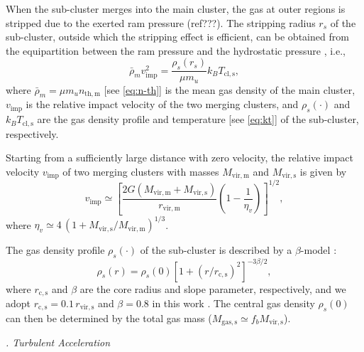 \documentclass[modern]{aastex62}
\newcommand{\R}[1]{\mathrm{#1}}
\newcommand{\editwip}[1]{{\leavevmode\color{magenta}#1}}
\newcounter{sssseccount}
\newcommand{\sssseclabel}{\alph{sssseccount}}
\newcommand{\ssssec}[1]{%
  \vspace{1ex}%
  \stepcounter{sssseccount}%
  \noindent\emph{\sssseclabel. #1}%
}
\begin{document}
\editwip{%
When the sub-cluster merges into the main cluster, the gas at outer regions
is stripped due to the exerted ram pressure (ref???).
The stripping radius $r_s$ of the sub-cluster, outside which the stripping
effect is efficient, can be obtained from the equipartition between the ram
pressure and the hydrostatic pressure \citep{cassano2005}, i.e.,
\begin{equation}
  \label{eq:rs-eqp}
  \bar{\rho}_m v_{\R{imp}}^2 = \frac{\rho_s(r_s)}{\mu m_u} k_B T_{\R{cl,s}},
\end{equation}
where
$\bar{\rho}_m = \mu m_u n_{\R{th,m}}$ [see \autoref{eq:n-th}] is the mean
gas density of the main cluster,
$v_{\R{imp}}$ is the relative impact velocity of the two merging clusters,
and $\rho_s(\cdot)$ and $k_B T_{\R{cl,s}}$ are the gas density profile and
temperature [see \autoref{eq:kt}] of the sub-cluster, respectively.

Starting from a sufficiently large distance with zero velocity,
the relative impact velocity $v_{\R{imp}}$ of two merging clusters with
masses $M_{\R{vir,m}}$ and $M_{\R{vir,s}}$ is given by
\citep{sarazin2002,cassano2005}
\begin{equation}
  \label{eq:v-imp}
  v_{\R{imp}} \simeq \left[
    \frac{2G (M_{\R{vir,m}} + M_{\R{vir,s}})}{r_{\R{vir,m}}}
    \left( 1 - \frac{1}{\eta_v} \right)\right]^{1/2},
\end{equation}
where $\eta_v \simeq 4 \,(1 + M_{\R{vir,s}}/M_{\R{vir,m}})^{1/3}$.

The gas density profile $\rho_s(\cdot)$ of the sub-cluster is described by
a $\beta$-model \citep{cavaliere1976}:
\begin{equation}
  \label{eq:beta-model}
  \rho_s(r) = \rho_s(0) \left[1 + (r / r_{\R{c,s}})^2 \right]^{-3\beta/2},
\end{equation}
where $r_{\R{c,s}}$ and $\beta$ are the core radius and slope parameter,
respectively, and we adopt $r_{\R{c,s}} = 0.1 \,r_{\R{vir,s}}$ and
$\beta = 0.8$ in this work \citep{cassano2005}.
The central gas density $\rho_s(0)$ can then be determined by the total gas
mass ($M_{\R{gas,s}} \simeq f_b M_{\R{vir,s}}$).
} %

\ssssec{Turbulent Acceleration}
\end{document}
